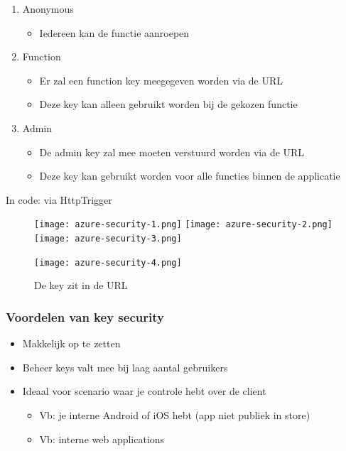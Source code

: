 \documentclass{article}
\begin{document}
\begin{enumerate}
    \item Anonymous
    \begin{itemize}
        \item Iedereen kan de functie aanroepen
    \end{itemize}
    \item Function
    \begin{itemize}
        \item Er zal een function key meegegeven worden via de URL
        \item Deze key kan alleen gebruikt worden bij de gekozen functie
    \end{itemize}
    \item Admin 
    \begin{itemize}
        \item De admin key zal mee moeten verstuurd worden via de URL
        \item Deze key kan gebruikt worden voor alle functies binnen de applicatie
    \end{itemize}
\end{enumerate}

In code: via HttpTrigger

\begin{figure}[H]
    \centering
    \texttt{[image: azure-security-1.png]}
    \texttt{[image: azure-security-2.png]}
    \texttt{[image: azure-security-3.png]}
    \caption{}
\end{figure}

\begin{figure}[H]
    \centering
    \texttt{[image: azure-security-4.png]}
    \caption{De key zit in de URL}
\end{figure}

\subsubsection{Voordelen van key security}
\begin{itemize}
    \item Makkelijk op te zetten
    \item Beheer keys valt mee bij laag aantal gebruikers
    \item Ideaal voor scenario waar je controle hebt over de client
    \begin{itemize}
        \item Vb: je interne Android of iOS hebt (app niet publiek in store)
        \item Vb: interne web applications
    \end{itemize}
\end{itemize}
\end{document}
